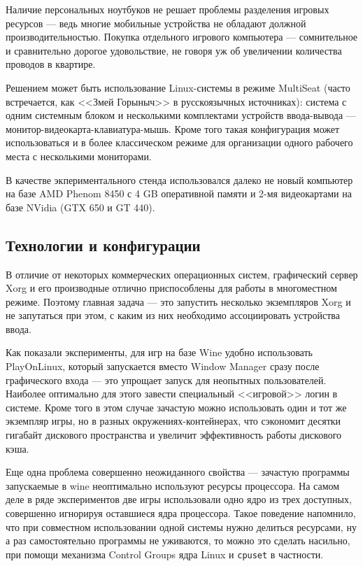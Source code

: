 \documentclass[10pt, a5paper]{article}
\begin{document}
Наличие персональных ноутбуков не решает проблемы разделения игровых ресурсов --- ведь
многие мобильные устройства не обладают должной производительностью. 
Покупка отдельного игрового компьютера --- сомнительное и сравнительно дорогое удовольствие, 
не говоря уж об увеличении количества проводов в квартире.

Решением может быть использование Linux-системы в режиме MultiSeat (часто встречается, как 
<<Змей Горыныч>> в русскоязычных источниках): система с одним системным блоком и несколькими 
комплектами устройств ввода-вывода --- монитор-видеокарта-клавиатура-мышь.
Кроме того такая конфигурация может использоваться и в более классическом режиме для организации одного рабочего места с несколькими мониторами.


В качестве экпериментального стенда использовался далеко не новый компьютер на базе AMD Phenom 8450
с 4 GB оперативной памяти и 2-мя видеокартами на базе NVidia (GTX 650 и GT 440).

\subsection*{Технологии и конфигурации}

В отличие от некоторых коммерческих операционных систем, графический сервер Xorg и его производные
отлично приспособлены для работы в многоместном режиме.
Поэтому главная задача --- это запустить несколько экземпляров Xorg и не запутаться при этом, 
с каким из них необходимо ассоциировать устройства ввода.

Как показали эксперименты, для игр на базе Wine удобно использовать PlayOnLinux, который запускается
вместо Window \linebreak Manager сразу после графического входа --- это упрощает запуск для неопытных
пользователей. Наиболее оптимально для этого завести специальный <<игровой>> логин в системе. 
Кроме того в этом случае зачастую можно использовать один и тот же экземпляр игры, но в 
разных окружениях-контейнерах, что сэкономит десятки гигабайт дискового пространства и 
увеличит эффективность работы дискового кэша.

Еще одна проблема совершенно неожиданного свойства --- зачастую программы запускаемые в wine 
неоптимально используют ресурсы процессора. На самом деле в ряде экспериментов две игры использовали
одно ядро из трех доступных, совершенно игнорируя оставшиеся ядра процессора. Такое поведение 
напомнило, что при совместном использовании одной системы нужно делиться ресурсами, ну а раз
самостоятельно программы не уживаются, то можно это сделать насильно, при помощи механизма
Control Groups ядра Linux и {\tt cpuset} в частности.
\end{document}
